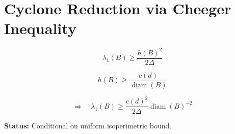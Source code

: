\documentclass{article}
\begin{document}
\section*{Cyclone Reduction via Cheeger Inequality}

\[
\lambda_1(B)\ge \frac{h(B)^2}{2\Delta}
\]

\[
h(B)\ge \frac{c(d)}{\operatorname{diam}(B)}
\]

\[
\Rightarrow\quad
\lambda_1(B)\ge \frac{c(d)^2}{2\Delta}\operatorname{diam}(B)^{-2}
\]

\textbf{Status:} Conditional on uniform isoperimetric bound.
\end{document}

